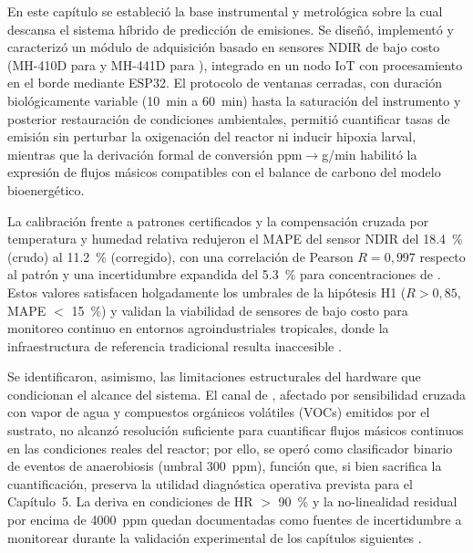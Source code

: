 
En este capítulo se estableció la base instrumental y metrológica sobre la cual descansa el sistema híbrido de predicción de emisiones. Se diseñó, implementó y caracterizó un módulo de adquisición basado en sensores NDIR de bajo costo (MH-410D para  y MH-441D para ), integrado en un nodo IoT con procesamiento en el borde mediante ESP32. El protocolo de ventanas cerradas, con duración biológicamente variable (\SI{10}{min} a \SI{60}{min}) hasta la saturación del instrumento y posterior restauración de condiciones ambientales, permitió cuantificar tasas de emisión sin perturbar la oxigenación del reactor ni inducir hipoxia larval, mientras que la derivación formal de conversión ppm$\rightarrow$g/min habilitó la expresión de flujos másicos compatibles con el balance de carbono del modelo bioenergético.

La calibración frente a patrones certificados y la compensación cruzada por temperatura y humedad relativa redujeron el MAPE del sensor NDIR del \SI{18.4}{\percent} (crudo) al \SI{11.2}{\percent} (corregido), con una correlación de Pearson $R = 0{,}997$ respecto al patrón y una incertidumbre expandida del \SI{5.3}{\percent} para concentraciones de . Estos valores satisfacen holgadamente los umbrales de la hipótesis H1 ($R > 0{,}85$, MAPE $<$ \SI{15}{\percent}) y validan la viabilidad de sensores de bajo costo para monitoreo continuo en entornos agroindustriales tropicales, donde la infraestructura de referencia tradicional resulta inaccesible \parencite{biagiDevelopmentMachineLearningbased2024a, rajRealTimeEstimation2023a}.

Se identificaron, asimismo, las limitaciones estructurales del hardware que condicionan el alcance del sistema. El canal de , afectado por sensibilidad cruzada con vapor de agua y compuestos orgánicos volátiles (VOCs) emitidos por el sustrato, no alcanzó resolución suficiente para cuantificar flujos másicos continuos en las condiciones reales del reactor; por ello, se operó como clasificador binario de eventos de anaerobiosis (umbral \SI{300}{ppm}), función que, si bien sacrifica la cuantificación, preserva la utilidad diagnóstica operativa prevista para el Capítulo~5. La deriva en condiciones de HR $>$ \SI{90}{\percent} y la no-linealidad residual por encima de \SI{4000}{ppm} quedan documentadas como fuentes de incertidumbre a monitorear durante la validación experimental de los capítulos siguientes \parencite{herrinCollateralDataQualitya, rossiEstimatingDynamicsGreenhouse2024a}.

